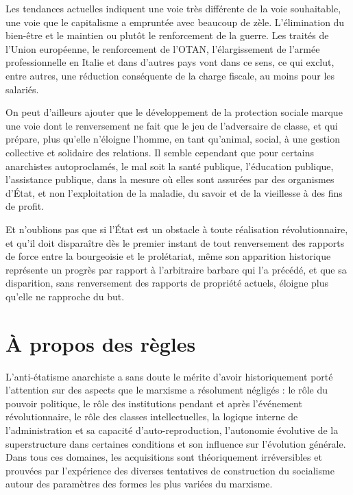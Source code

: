 Les tendances actuelles indiquent une voie très différente de la voie souhaitable, une voie que le capitalisme a empruntée avec beaucoup de zèle. L'élimination du bien-être et le maintien ou plutôt le renforcement de la guerre. Les traités de l'Union européenne, le renforcement de l'OTAN, l'élargissement de l'armée professionnelle en Italie et dans d'autres pays vont dans ce sens, ce qui exclut, entre autres, une réduction conséquente de la charge fiscale, au moins pour les salariés.

On peut d'ailleurs ajouter que le développement de la protection sociale marque une voie dont le renversement ne fait que le jeu de l'adversaire de classe, et qui prépare, plus qu'elle n'éloigne l'homme, en tant qu'animal, social, à une gestion collective et solidaire des relations. Il semble cependant que pour certains anarchistes autoproclamés, le mal soit la santé publique, l'éducation publique, l'assistance publique, dans la mesure où elles sont assurées par des organismes d'État, et non l'exploitation de la maladie, du savoir et de la vieillesse à des fins de profit.

Et n'oublions pas que si l'État est un obstacle à toute réalisation révolutionnaire, et qu'il doit disparaître dès le premier instant de tout renversement des rapports de force entre la bourgeoisie et le prolétariat, même son apparition historique représente un progrès par rapport à l'arbitraire barbare qui l'a précédé, et que sa disparition, sans renversement des rapports de propriété actuels, éloigne plus qu'elle ne rapproche du but.

\chapter{À propos des règles}

L'anti-étatisme anarchiste a sans doute le mérite d'avoir historiquement porté l'attention sur des aspects que le marxisme a résolument négligés : le rôle du pouvoir politique, le rôle des institutions pendant et après l'événement révolutionnaire, le rôle des classes intellectuelles, la logique interne de l'administration et sa capacité d'auto-reproduction, l'autonomie évolutive de la superstructure dans certaines conditions et son influence sur l'évolution générale. Dans tous ces domaines, les acquisitions sont théoriquement irréversibles et prouvées par l'expérience des diverses tentatives de construction du socialisme autour des paramètres des formes les plus variées du marxisme.

